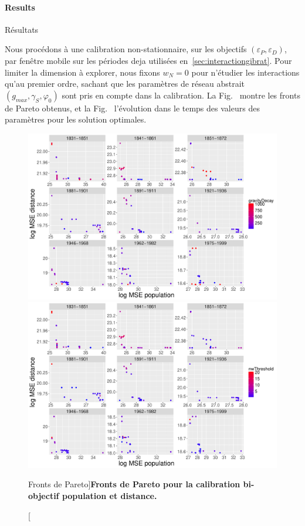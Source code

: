 \paragraph{Results}{Résultats}


Nous procédons à une calibration non-stationnaire, sur les objectifs $(\varepsilon_P,\varepsilon_D)$, par fenêtre mobile sur les périodes deja utilisées en~\ref{sec:interactiongibrat}. Pour limiter la dimension à explorer, nous fixons $w_N = 0$ pour n'étudier les interactions qu'au premier ordre, sachant que les paramètres de réseau abstrait $(g_{max},\gamma_S,\varphi_0)$ sont pris en compte dans la calibration. La Fig.~\label{fig:macrocoevol:pareto} montre les fronts de Pareto obtenus, et la Fig.~\label{fig:macrocoevol:parameters} l'évolution dans le temps des valeurs des paramètres pour les solution optimales.


\begin{figure}
	\includegraphics[width=0.9\linewidth]{Figures/MacroCoEvol/pareto_gravityDecay}\\
	\includegraphics[width=0.9\linewidth]{Figures/MacroCoEvol/pareto_nwThreshold}
	\caption[Pareto fronts][Fronts de Pareto]{\label{fig:macrocoevol:pareto}}{\textbf{Fronts de Pareto pour la calibration bi-objectif population et distance.}\label{fig:macrocoevol:pareto}}
\end{figure}


